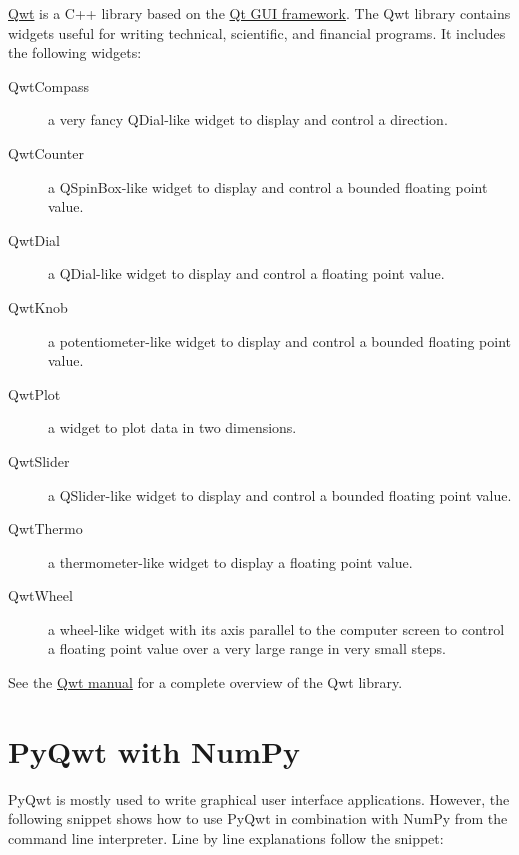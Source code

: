 \documentclass[a4paper,10pt,english]{manual}
\begin{document}
\href{http://qwt.sourceforge.net}{Qwt} is a C++ library based on the
\href{http://trolltech.com/products/qt}{Qt GUI framework}.
The Qwt library contains widgets useful for writing technical,
scientific, and financial programs.
It includes the following widgets:
\begin{description}
\item[QwtCompass]
a very fancy QDial-like widget to display and control a direction.

\item[QwtCounter]
a QSpinBox-like widget to display and control a bounded floating
point value.

\item[QwtDial]
a QDial-like widget to display and control a floating point value.

\item[QwtKnob]
a potentiometer-like widget to display and control a bounded
floating point value.

\item[QwtPlot]
a widget to plot data in two dimensions.

\item[QwtSlider]
a QSlider-like widget to display and control a bounded floating
point value.

\item[QwtThermo]
a thermometer-like widget to display a floating point value.

\item[QwtWheel]
a wheel-like widget with its axis parallel to the computer screen
to control a floating point value over a very large range in very
small steps.

\end{description}

See the \href{http://qwt.sourceforge.net}{Qwt manual} for a complete
overview of the Qwt library.


\section{PyQwt with NumPy}

PyQwt is mostly used to write graphical user interface applications.
However, the following snippet shows how to use PyQwt in combination
with NumPy from the command line interpreter.
Line by line explanations follow the snippet:
\end{document}
